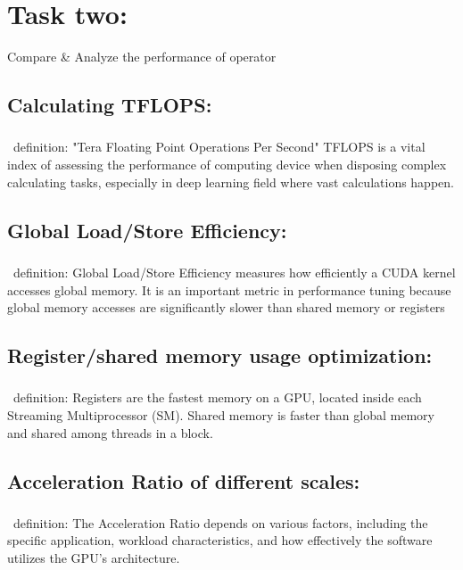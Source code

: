 \section{\LARGE Task two:}
\begin{IEEEkeywords}
    Compare \& \newline
    Analyze the performance of operator
\end{IEEEkeywords}
\vspace{-0.3cm}

\subsection{Calculating TFLOPS:}
\subsubsection{}~definition:\newline
"Tera Floating Point Operations Per Second"\newline
TFLOPS is a vital index of assessing the performance of computing device when disposing 
complex calculating tasks, especially in deep learning field where vast calculations happen.

\subsection{Global Load/Store Efficiency:}
\subsubsection{}~definition:\newline
Global Load/Store Efficiency measures how efficiently a CUDA kernel accesses global memory.
It is an important metric in performance tuning because global memory accesses are 
significantly slower than shared memory or registers\newline

\subsection{Register/shared memory usage optimization:}
\subsubsection{}~definition:\newline
Registers are the fastest memory on a GPU, located inside each Streaming Multiprocessor (SM).\newline
Shared memory is faster than global memory and shared among threads in a block.\newline

\subsection{Acceleration Ratio of different scales:}
\subsubsection{}~definition:\newline
The Acceleration Ratio depends on various factors, including the specific application,
workload characteristics, and how effectively the software utilizes the GPU's architecture.
